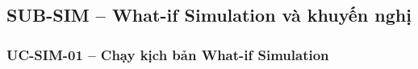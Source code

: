 \newcommand{\SIMDiagramFigure}[3]{%
  \begingroup
  \setlength{\intextsep}{0pt}
  \InsertArtifact[0.90\textheight]{#1}{#2}{#3}{}
  \endgroup
}

\subsection{SUB-SIM -- What-if Simulation và khuyến nghị}


\subsubsection{UC-SIM-01 -- Chạy kịch bản What-if Simulation}



